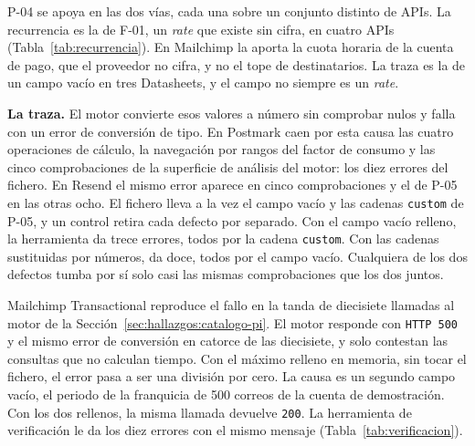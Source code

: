 P-04 se apoya en las dos vías, cada una sobre un conjunto distinto de APIs.
La recurrencia es la de F-01, un \textit{rate} que existe sin cifra, en cuatro APIs (Tabla~\ref{tab:recurrencia}).
En Mailchimp la aporta la cuota horaria de la cuenta de pago, que el proveedor no cifra, y no el tope de destinatarios.
La traza es la de un campo vacío en tres Datasheets, y el campo no siempre es un \textit{rate}.

\textbf{La traza.} El motor convierte esos valores a número sin comprobar nulos y
falla con un error de conversión de tipo. En Postmark caen por esta causa las
cuatro operaciones de cálculo, la navegación por rangos del factor de consumo y
las cinco comprobaciones de la superficie de análisis del motor: los diez errores del
fichero. En Resend el mismo error aparece en cinco comprobaciones y el de P-05 en las
otras ocho.
El fichero lleva a la vez el campo vacío y las cadenas \texttt{custom} de P-05, y un control retira cada defecto por separado.
Con el campo vacío relleno, la herramienta da trece errores, todos por la cadena \texttt{custom}.
Con las cadenas sustituidas por números, da doce, todos por el campo vacío.
Cualquiera de los dos defectos tumba por sí solo casi las mismas comprobaciones que los dos juntos.

Mailchimp Transactional reproduce el fallo en la tanda de diecisiete llamadas al motor de la Sección~\ref{sec:hallazgos:catalogo-pi}.
El motor responde con \texttt{HTTP 500} y el mismo error de conversión en catorce de las diecisiete, y solo contestan las consultas que no calculan tiempo.
Con el máximo relleno en memoria, sin tocar el fichero, el error pasa a ser una división por cero.
La causa es un segundo campo vacío, el periodo de la franquicia de 500 correos de la cuenta de demostración.
Con los dos rellenos, la misma llamada devuelve \texttt{200}.
La herramienta de verificación le da los diez errores con el mismo mensaje (Tabla~\ref{tab:verificacion}).

